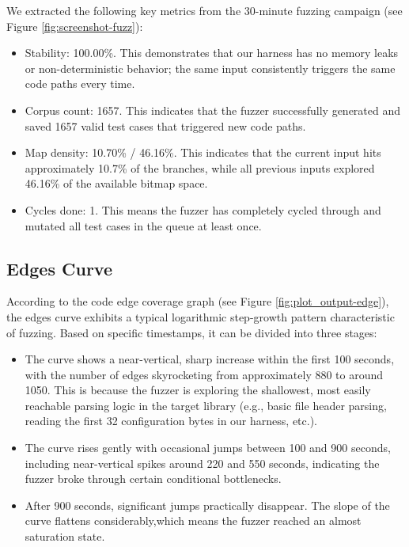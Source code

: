 \documentclass[letterpaper,twocolumn,10pt]{article}
\begin{document}
We extracted the following key metrics from the 30-minute fuzzing campaign (see Figure \ref{fig:screenshot-fuzz}):
\begin{itemize}
    \item Stability: 100.00\%. This demonstrates that our harness has no memory leaks or non-deterministic behavior; the same input consistently triggers the same code paths every time.
    \item Corpus count: 1657. This indicates that the fuzzer successfully generated and saved 1657 valid test cases that triggered new code paths.
    \item Map density: 10.70\% / 46.16\%. This indicates that the current input hits approximately 10.7\% of the branches, while all previous inputs explored 46.16\% of the available bitmap space.
    \item Cycles done: 1. This means the fuzzer has completely cycled through and mutated all test cases in the queue at least once.
\end{itemize}


\subsection{Edges Curve}
According to the code edge coverage graph (see Figure \ref{fig:plot_output-edge}), the edges curve exhibits a typical logarithmic step-growth pattern characteristic of fuzzing. Based on specific timestamps, it can be divided into three stages:
\begin{itemize}
    \item The curve shows a near-vertical, sharp increase within the first 100 seconds, with the number of edges skyrocketing from approximately 880 to around 1050. This is because the fuzzer is exploring the shallowest, most easily reachable parsing logic in the target library (e.g., basic file header parsing, reading the first 32 configuration bytes in our harness, etc.).
    \item The curve rises gently with occasional jumps between 100 and 900 seconds, including near-vertical spikes around 220 and 550 seconds, indicating the fuzzer broke through certain conditional bottlenecks.
    \item After 900 seconds, significant jumps practically disappear. The slope of the curve flattens considerably,which means the fuzzer reached an almost saturation state.
\end{itemize}



\end{document}
